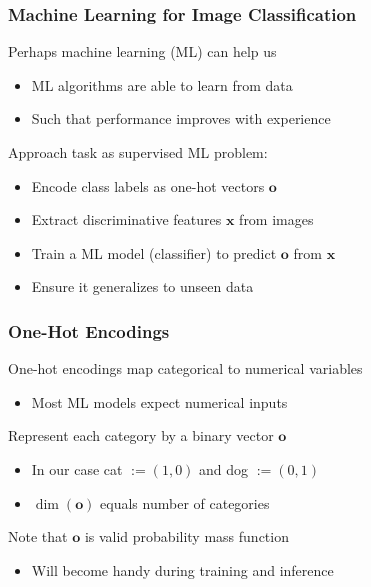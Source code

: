 \documentclass[xetex,professionalfont]{beamer}
\renewcommand\emph[1]{\textcolor{tuwcvl_cvl_blue}{#1}}
\renewcommand{\vec}[1]{\ensuremath{\mathbf{#1}}}
\newcommand{\vx}{\vec{x}}
\newcommand{\vo}{\vec{o}}
\begin{document}
\begin{frame}
\frametitle{Machine Learning for Image Classification}

Perhaps \emph{machine learning} (\emph{ML}) can help us
\begin{itemize}
    \item ML algorithms are able to learn from data
    \item Such that performance improves with experience %
\end{itemize}

\bigskip

Approach task as \emph{supervised} ML problem:
\begin{itemize}
    \item Encode class labels as one-hot vectors $\vo$
    \item Extract discriminative features $\vx$ from images
    \item Train a \emph{ML model} (\emph{classifier}) to predict $\vo$ from $\vx$
    \item Ensure it generalizes to unseen data
\end{itemize}

\end{frame}


\begin{frame}
\frametitle{One-Hot Encodings}

\emph{One-hot encodings} map categorical to numerical variables
\begin{itemize}
    \item Most ML models expect numerical inputs
\end{itemize}

\bigskip

Represent each category by a binary vector $\vo$
\begin{itemize}
    \item In our case cat $:=(1,0)$ and dog $:=(0,1)$
    \item $\dim(\vo)$ equals number of categories
\end{itemize}

\bigskip

Note that $\vo$ is valid probability mass function
\begin{itemize}
    \item Will become handy during training and inference
\end{itemize}

\end{frame}
\end{document}
